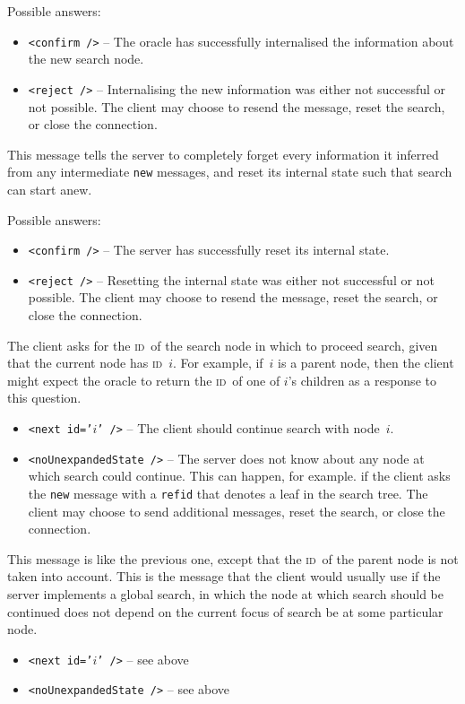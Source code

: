 \documentclass[halfparskip]{scrartcl}
\newcommand*{\ID}{%
  \textsc{id}}
\newcommand*{\MESSAGE}[1]{%
  \bigskip\par\fbox{#1}}
\newcommand*{\XMLTAG}[1]{%
  \texttt{<#1 />}}
\begin{document}
Possible answers:
\begin{itemize}
\item \XMLTAG{confirm} -- The oracle has successfully internalised the
  information about the new search node.
\item \XMLTAG{reject} -- Internalising the new information was either
  not successful or not possible.  The client may choose to resend the
  message, reset the search, or close the connection.
\end{itemize}

\MESSAGE{\XMLTAG{reset}}

This message tells the server to completely forget every information
it inferred from any intermediate \texttt{new} messages, and reset its
internal state such that search can start anew.

Possible answers:
\begin{itemize}
\item \XMLTAG{confirm} -- The server has successfully reset its
  internal state.
\item \XMLTAG{reject} -- Resetting the internal state was either not
  successful or not possible.  The client may choose to resend the
  message, reset the search, or close the connection.
\end{itemize}

\MESSAGE{\XMLTAG{chooseLocal refid='$i$'}}

The client asks for the \ID\ of the search node in which to proceed
search, given that the current node has \ID~$i$.  For example, if~$i$
is a parent node, then the client might expect the oracle to return
the \ID\ of one of $i$'s children as a response to this question.

\begin{itemize}
\item \XMLTAG{next id='$i$'} -- The client should continue search with
  node~$i$.
\item \XMLTAG{noUnexpandedState} -- The server does not know about any
  node at which search could continue.  This can happen, for example.
  if the client asks the \texttt{new} message with a \texttt{refid}
  that denotes a leaf in the search tree.  The client may choose to
  send additional messages, reset the search, or close the connection.
\end{itemize}

\MESSAGE{\XMLTAG{chooseGlobal}}

This message is like the previous one, except that the \ID\ of the
parent node is not taken into account.  This is the message that the
client would usually use if the server implements a global search, in
which the node at which search should be continued does not depend on
the current focus of search be at some particular node.

\begin{itemize}
\item \XMLTAG{next id='$i$'} -- see above
\item \XMLTAG{noUnexpandedState} -- see above
\end{itemize}
\end{document}
